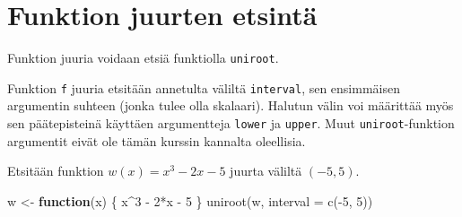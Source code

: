 \documentclass[
]{book}
\newenvironment{Shaded}{\begin{snugshade}}{\end{snugshade}}
\newcommand{\AttributeTok}[1]{\textcolor[rgb]{0.77,0.63,0.00}{#1}}
\newcommand{\ConstantTok}[1]{\textcolor[rgb]{0.00,0.00,0.00}{#1}}
\newcommand{\ControlFlowTok}[1]{\textcolor[rgb]{0.13,0.29,0.53}{\textbf{#1}}}
\newcommand{\DecValTok}[1]{\textcolor[rgb]{0.00,0.00,0.81}{#1}}
\newcommand{\FloatTok}[1]{\textcolor[rgb]{0.00,0.00,0.81}{#1}}
\newcommand{\FunctionTok}[1]{\textcolor[rgb]{0.00,0.00,0.00}{#1}}
\newcommand{\NormalTok}[1]{#1}
\newcommand{\OtherTok}[1]{\textcolor[rgb]{0.56,0.35,0.01}{#1}}
\newcommand{\SpecialCharTok}[1]{\textcolor[rgb]{0.00,0.00,0.00}{#1}}
\newcommand{\StringTok}[1]{\textcolor[rgb]{0.31,0.60,0.02}{#1}}
\begin{document}
\hypertarget{funktion-juurten-etsintuxe4}{%
\section{Funktion juurten etsintä}\label{funktion-juurten-etsintuxe4}}

Funktion juuria voidaan etsiä funktiolla \texttt{uniroot}.

\begin{Shaded}
\end{Shaded}

Funktion \texttt{f} juuria etsitään annetulta väliltä \texttt{interval}, sen ensimmäisen argumentin suhteen (jonka tulee olla skalaari). Halutun välin voi määrittää myös sen päätepisteinä käyttäen argumentteja \texttt{lower} ja \texttt{upper}. Muut \texttt{uniroot}-funktion argumentit eivät ole tämän kurssin kannalta oleellisia.

Etsitään funktion \(w(x)=x^3-2x-5\) juurta väliltä \((-5,5)\).

\begin{Shaded}
\begin{Highlighting}[]
\NormalTok{w }\OtherTok{\textless{}{-}} \ControlFlowTok{function}\NormalTok{(x) \{ x}\SpecialCharTok{\^{}}\DecValTok{3} \SpecialCharTok{{-}} \DecValTok{2}\SpecialCharTok{*}\NormalTok{x }\SpecialCharTok{{-}} \DecValTok{5}\NormalTok{ \}}
\FunctionTok{uniroot}\NormalTok{(w, }\AttributeTok{interval =} \FunctionTok{c}\NormalTok{(}\SpecialCharTok{{-}}\DecValTok{5}\NormalTok{, }\DecValTok{5}\NormalTok{))}
\end{Highlighting}
\end{Shaded}
\end{document}
